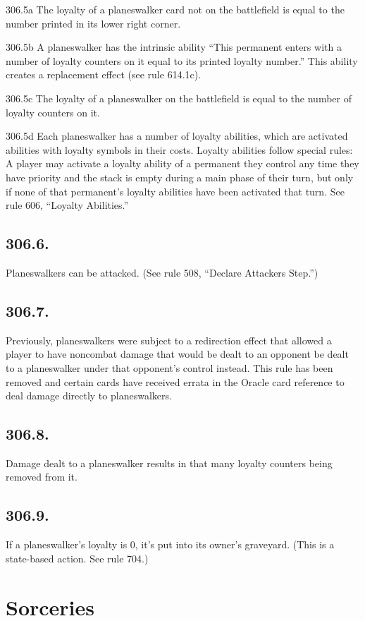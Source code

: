 306.5a The loyalty of a planeswalker card not on the battlefield is equal to the number printed in its lower right corner.

306.5b A planeswalker has the intrinsic ability “This permanent enters with a number of loyalty counters on it equal to its printed loyalty number.” This ability creates a replacement effect (see rule 614.1c).

306.5c The loyalty of a planeswalker on the battlefield is equal to the number of loyalty counters on it.

306.5d Each planeswalker has a number of loyalty abilities, which are activated abilities with loyalty symbols in their costs. Loyalty abilities follow special rules: A player may activate a loyalty ability of a permanent they control any time they have priority and the stack is empty during a main phase of their turn, but only if none of that permanent’s loyalty abilities have been activated that turn. See rule 606, “Loyalty Abilities.”

\subsection*{306.6.}
Planeswalkers can be attacked. (See rule 508, “Declare Attackers Step.”)

\subsection*{306.7.}
Previously, planeswalkers were subject to a redirection effect that allowed a player to have noncombat damage that would be dealt to an opponent be dealt to a planeswalker under that opponent’s control instead. This rule has been removed and certain cards have received errata in the Oracle card reference to deal damage directly to planeswalkers.

\subsection*{306.8.}
Damage dealt to a planeswalker results in that many loyalty counters being removed from it.

\subsection*{306.9.}
If a planeswalker’s loyalty is 0, it’s put into its owner’s graveyard. (This is a state-based action. See rule 704.)

\section{Sorceries}
